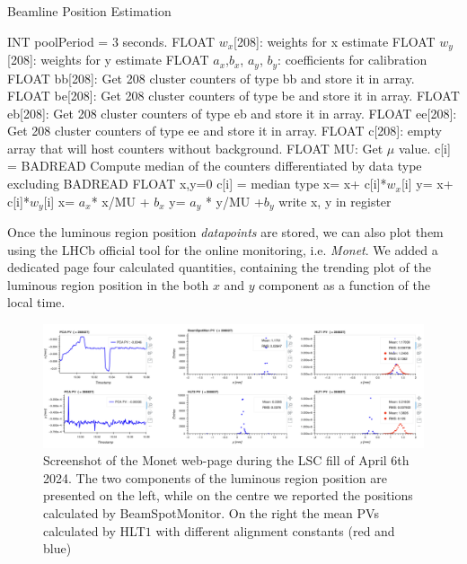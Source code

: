 \begin{algorithm}
\caption{Beamline Position Estimation}\label{alg:beamline}
\begin{algorithmic}[1]
\ENSURE  INT poolPeriod = 3 seconds.
\ENSURE  FLOAT $w_x$[208]: weights for x estimate
\ENSURE  FLOAT $w_y$[208]: weights for y estimate
\ENSURE  FLOAT $a_x$,$ b_x$, $a_y$, $b_y$: coefficients for calibration 
        \STATE FLOAT  bb[208]: Get 208 cluster counters of type bb and store it in array.
        \STATE FLOAT  be[208]: Get 208 cluster counters of type be and store it in array.
        \STATE FLOAT  eb[208]: Get 208 cluster counters of type eb and store it in array.
        \STATE FLOAT  ee[208]: Get 208 cluster counters of type ee and store it in array.
        \STATE FLOAT c[208]: empty array that will host counters without background.
        \STATE FLOAT MU: Get $\mu$ value.
        \ELSE
        \STATE c[i] = BADREAD
        \ENDIF
        \ENDFOR
        \STATE Compute median of the counters differentiated by data type excluding BADREAD 
        \STATE FLOAT x,y=0
            \STATE c[i] = median type 
        \ENDIF
        \STATE x= x+ c[i]*$w_x$[i]
        \STATE y= x+ c[i]*$w_y$[i]
        \ENDFOR
        \STATE x= $a_x$* x/MU + $b_x$
        \STATE y= $a_y$ * y/MU +$b_y$
        \STATE write x, y in register
        \ENDIF
    \ENDIF
\ENDWHILE
\end{algorithmic}
\end{algorithm}


Once the luminous region position \textit{datapoints} are stored, we can also plot them using the LHCb official tool for the online monitoring, i.e. \textit{Monet}. We added a dedicated page four calculated quantities, containing the trending plot of the luminous region position in the both $x$ and $y$ component as a function of the local time.

\begin{figure}
    \centering
    \includegraphics[width=\textwidth]{figures/Monet_beamline_screen.png}
    \caption{Screenshot of the Monet web-page during the LSC fill of April 6th 2024. The two components of the luminous region position are presented on the left, while on the centre we reported the positions calculated by BeamSpotMonitor. On the right the mean PVs calculated by HLT$1$ with different alignment constants (red and blue)}
    \label{fig:monet_beamline}
\end{figure}

